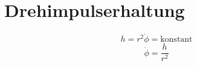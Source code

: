 \section{Drehimpulserhaltung}
\[ h = r^2\dot{\phi} = \text{konstant} \]
\[ \dot{\phi} = \frac{h}{r^2} \]